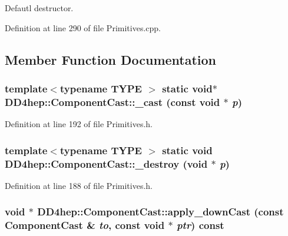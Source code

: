 Defautl destructor. 

Definition at line 290 of file Primitives.cpp.

\subsection{Member Function Documentation}
\hypertarget{class_d_d4hep_1_1_component_cast_aec81a88f83f9f521a28779fc922c9656}{
\subsubsection[{\_\-cast}]{\setlength{\rightskip}{0pt plus 5cm}template$<$typename TYPE $>$ static void$\ast$ DD4hep::ComponentCast::\_\-cast (const void $\ast$ {\em p})}}
\label{class_d_d4hep_1_1_component_cast_aec81a88f83f9f521a28779fc922c9656}


Definition at line 192 of file Primitives.h.\hypertarget{class_d_d4hep_1_1_component_cast_ab2bb84f3ada8c005febcf8167ddc13bf}{
\subsubsection[{\_\-destroy}]{\setlength{\rightskip}{0pt plus 5cm}template$<$typename TYPE $>$ static void DD4hep::ComponentCast::\_\-destroy (void $\ast$ {\em p})}}
\label{class_d_d4hep_1_1_component_cast_ab2bb84f3ada8c005febcf8167ddc13bf}


Definition at line 188 of file Primitives.h.\hypertarget{class_d_d4hep_1_1_component_cast_abf0cc9ff379a6dfb09f95c2a6c3c9fb7}{
\subsubsection[{apply\_\-downCast}]{\setlength{\rightskip}{0pt plus 5cm}void $\ast$ DD4hep::ComponentCast::apply\_\-downCast (const {\bf ComponentCast} \& {\em to}, \/  const void $\ast$ {\em ptr}) const}}
\label{class_d_d4hep_1_1_component_cast_abf0cc9ff379a6dfb09f95c2a6c3c9fb7}


